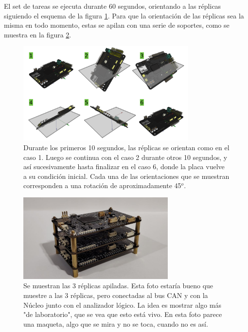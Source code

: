 El set de tareas se ejecuta durante 60 segundos, orientando a las réplicas siguiendo el esquema de la figura \ref{fig:orientaciones_prueba}. Para que la orientación de las réplicas sea la misma en todo momento, estas se apilan con una serie de soportes, como se muestra en la figura \ref{fig:pruebas_stackeadas}.

\begin{figure}[H]
    \centering
    \includegraphics[width=0.8\textwidth]{img/orientaciones_prueba.png}
    \caption{Durante los primeros 10 segundos, las réplicas se orientan como en el caso 1. Luego se continua con el caso 2 durante otros 10 segundos, y así sucesivamente hasta finalizar en el caso 6, donde la placa vuelve a su condición inicial. Cada una de las orientaciones que se muestran corresponden a una rotación de aproximadamente 45$^o$.}
    \label{fig:orientaciones_prueba}
\end{figure}

\begin{figure}[H]
    \centering
    \includegraphics[width=0.7\textwidth]{img/pruebas_stackeadas.png}
    \caption{Se muestran las 3 réplicas apiladas. {\color{red} Esta foto estaría bueno que muestre a las 3 réplicas, pero conectadas al bus CAN y con la Núcleo junto con el analizador lógico. La idea es mostrar algo más "de laboratorio", que se vea que esto está vivo. En esta foto parece una maqueta, algo que se mira y no se toca, cuando no es así.}}
    \label{fig:pruebas_stackeadas}
\end{figure}

